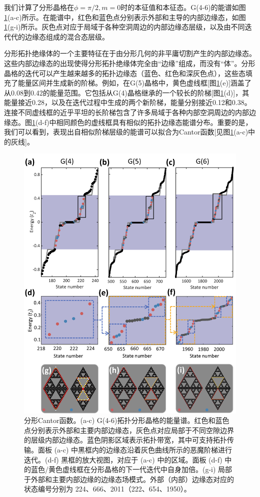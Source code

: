 我们计算了分形晶格在$\phi=\pi/2,m=0$时的本征值和本征态。G(4-6)的能谱如图\ref{fig:DevStair}(a-c)所示。在能谱中，红色和蓝色点分别表示外部和主导的内部边缘态，如图\ref{fig:DevStair}(g-i)所示。灰色点对应于局域于各种空洞周边的内部边缘态层级，以及由不同迭代代的边缘态组成的混合态层级。

分形拓扑绝缘体的一个主要特征在于由分形几何的非平庸切割产生的内部边缘态。这些内部边缘态的出现使得分形拓扑绝缘体完全由“边缘”组成，而没有“体”\cite{yang2020photonic,biesenthal2022fractal}。分形晶格的迭代可以产生越来越多的拓扑边缘态（蓝色、红色和深灰色点），这些态填充了能量区间并生成新的阶梯。例如，在G(5)晶格中，黄色虚线框[图\ref{fig:DevStair}(e)]涵盖了从0.08到0.42的能量范围。它包括从G(4)晶格继承的一个较长的阶梯[图\ref{fig:DevStair}(d)]，其能量接近0.28，以及在迭代过程中生成的两个新阶梯，能量分别接近0.12和0.38。连接不同虚线框的近乎平坦的长阶梯包含了许多局域于各种内部空洞周边的内部边缘态。图\ref{fig:DevStair}(d-f)中相同颜色的虚线框具有相似的拓扑边缘态能谱分布。重要的是，我们可以看到，表现出自相似阶梯层级的能谱可以拟合为Cantor函数\cite{Mandelbrot1982,bak1986devil}[见图\ref{fig:DevStair}(a-c)中的灰线]。 

\begin{figure}[htbp]
    \centering
    \includegraphics[width=0.65\linewidth]{figure/FracHaldTheo/DevStair.PNG}
    \caption{分形Cantor函数。(a-c) G(4-6)拓扑分形晶格的能量谱。红色和蓝色点分别表示外部和主要内部边缘态，灰色点对应局部于不同空隙边界的层级内部边缘态。蓝色阴影区域表示拓扑带宽，其中可支持拓扑传输。面板 (a-c) 中黑框内的边缘态沿着灰色曲线所示的恶魔阶梯进行迭代。(d-f) 黑框的放大视图，对应于 (a-c) 中的区域。面板 (d-f) 中的蓝色/黄色虚线框在分形晶格的下一代迭代中自身加倍。(g-i) 局部于外部和主要内部边缘的边缘态场模式。外部（内部）边缘态对应的状态编号分别为 224、666、2011（222、654、1950）。}
    \label{fig:DevStair}
\end{figure}

